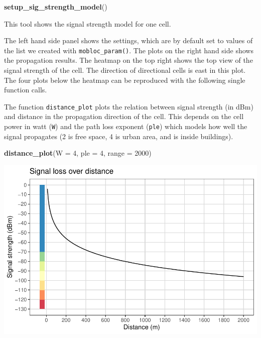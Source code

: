 \documentclass[
]{article}
\newenvironment{Shaded}{\begin{snugshade}}{\end{snugshade}}
\newcommand{\DataTypeTok}[1]{\textcolor[rgb]{0.13,0.29,0.53}{#1}}
\newcommand{\DecValTok}[1]{\textcolor[rgb]{0.00,0.00,0.81}{#1}}
\newcommand{\KeywordTok}[1]{\textcolor[rgb]{0.13,0.29,0.53}{\textbf{#1}}}
\newcommand{\NormalTok}[1]{#1}
\begin{document}
\begin{Shaded}
\begin{Highlighting}[]
\KeywordTok{setup_sig_strength_model}\NormalTok{()}
\end{Highlighting}
\end{Shaded}

This tool shows the signal strength model for one cell.

The left hand side panel shows the settings, which are by default set to
values of the list we created with \texttt{mobloc\_param()}. The plots
on the right hand side shows the propagation results. The heatmap on the
top right shows the top view of the signal strength of the cell. The
direction of directional cells is east in this plot. The four plots
below the heatmap can be reproduced with the following single function
calls.

The function \texttt{distance\_plot} plots the relation between signal
strength (in dBm) and distance in the propagation direction of the cell.
This depends on the cell power in watt (\texttt{W}) and the path loss
exponent (\texttt{ple}) which models how well the signal propagates (2
is free space, 4 is urban area, and is inside buildings).

\begin{Shaded}
\begin{Highlighting}[]
\KeywordTok{distance_plot}\NormalTok{(}\DataTypeTok{W =} \DecValTok{4}\NormalTok{, }\DataTypeTok{ple =} \DecValTok{4}\NormalTok{, }\DataTypeTok{range =} \DecValTok{2000}\NormalTok{)}
\end{Highlighting}
\end{Shaded}

\includegraphics{mobvis-mobloc_files/figure-latex/unnamed-chunk-5-1.pdf}
\end{document}
